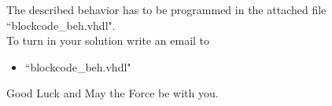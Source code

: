 \documentclass[a4paper,12pt]{article}
\begin{document}
\newpage

The described  behavior has to be programmed in the attached file ``blockcode\_beh.vhdl".\\

To turn in your solution write an email to %
\begin{itemize}
\item ``blockcode\_beh.vhdl"
\end{itemize}

\vspace{0.7cm}
Good Luck and May the Force be with you.
\end{document}
